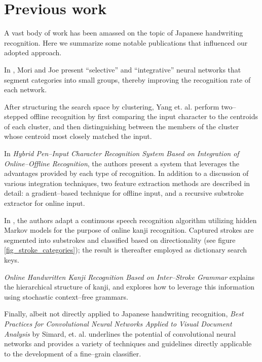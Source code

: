 \documentclass[10pt,conference,a4paper]{IEEEtran}
\begin{document}
	\section{Previous work}
	\label{sec:previous_work}

	A vast body of work has been amassed on the topic of Japanese handwriting recognition.
	Here we summarize some notable publications that influenced our adopted approach.


	In \cite{joe1989large}, Mori and Joe present ``selective'' and ``integrative'' neural networks that 
	segment categories into small groups, thereby improving the recognition rate of each network.

	
	After structuring the search space by clustering, Yang et. al. perform two--stepped offline recognition by first
	comparing the input character to the centroids of each cluster, and then distinguishing between the members of the cluster
	whose centroid most closely matched the input. \cite{yang2003accelerating}


	In \emph{Hybrid Pen--Input Character Recognition System Based on Integration of Online--Offline Recognition},
	the authors present a system that leverages the advantages provided by each type of recognition.
	In addition to a discussion of various integration techniques, two feature extraction methods are described in detail: 
	a gradient--based technique for offline input, and a recursive substroke extractor for online input.


	In \cite{nakai2001substroke}, the authors adapt a continuous speech recognition algorithm utilizing
	hidden Markov models for the purpose of online kanji recognition. Captured strokes are segmented into
	substrokes and classified based on directionality (see figure \ref{fig_stroke_categories});
	the result is thereafter employed as dictionary search keys.


	\emph{Online Handwritten Kanji Recognition Based on Inter--Stroke Grammar} explains the hierarchical structure of kanji,
	and explores how to leverage this information using stochastic context--free grammars. \cite{ota2007online}

	Finally, albeit not directly applied to Japanese handwriting recognition, \emph{Best Practices for Convolutional Neural Networks
	Applied to Visual Document Analysis} by Simard, et. al. underlines the potential of convolutional neural networks 
	and provides a variety of techniques and guidelines directly applicable to the development of a fine--grain classifier. \cite{simard2003best}
\end{document}
